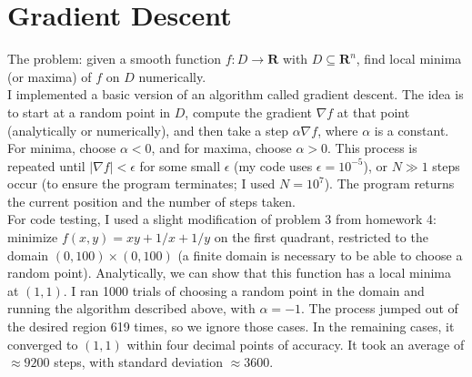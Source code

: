 \documentclass[11pt]{article}
\begin{document}
\section{Gradient Descent}
The problem: given a smooth function $f:D\to\mathbf{R}$ with $D\subseteq\mathbf{R}^n$, find local minima (or maxima) of $f$ on $D$ numerically. \\
\indent I implemented a basic version of an algorithm called gradient descent. The idea is to start at a random point in $D$, compute the gradient $\nabla f$ at that point (analytically or numerically), and then take a step $\alpha \nabla f$, where $\alpha$ is a constant. For minima, choose $\alpha<0$, and for maxima, choose $\alpha>0$. This process is repeated until $|\nabla f|<\epsilon$ for some small $\epsilon$ (my code uses $\epsilon = 10^{-5}$), or $N\gg1$ steps occur (to ensure the program terminates; I used $N=10^7$). The program returns the current position and the number of steps taken. \\
\indent For code testing, I used a slight modification of problem 3 from homework 4: minimize $f(x,y) = xy + 1/x + 1/y$ on the first quadrant, restricted to the domain $(0,100)\times(0,100)$ (a finite domain is necessary to be able to choose a random point). Analytically, we can show that this function has a local minima at $(1,1)$. I ran 1000 trials of choosing a random point in the domain and running the algorithm described above, with $\alpha = -1$. The process jumped out of the desired region 619 times, so we ignore those cases. In the remaining cases, it converged to $(1,1)$ within four decimal points of accuracy. It took an average of $\approx 9200$ steps, with standard deviation $\approx 3600$.
\end{document}
